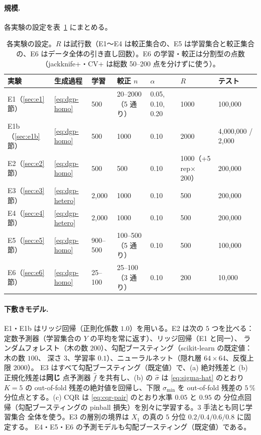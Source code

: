 \documentclass[a4paper,11pt]{jsarticle}
\theoremstyle{definition}
\theoremstyle{plain}
\theoremstyle{remark}
\newcommand{\fhat}{\hat{f}}
\begin{document}
\paragraph{規模.}
各実験の設定を表~\ref{tab:exp-setup} にまとめる。

\begin{table}[htbp]
  \centering
  \caption{各実験の設定。$R$ は試行数（E1〜E4 は較正集合の、E5 は学習集合と較正集合の、E6 はデータ全体の引き直し回数）。E6 の学習・較正は分割型の点数（jackknife+・CV+ は総数 50--200 点を分けずに使う）。}
  \label{tab:exp-setup}
  \footnotesize
  \setlength{\tabcolsep}{3pt}
  \begin{tabular}{lllllll}
    \toprule
    実験 & 生成過程 & 学習 & 較正 $n$ & $\alpha$ & $R$ & テスト \\
    \midrule
    E1（\ref{sec:e1}節） & \eqref{eq:dgp-homo} & 500 & 20--2000（5 通り） & 0.05, 0.10, 0.20 & 1000 & 100,000 \\
    E1b（\ref{sec:e1b}節） & \eqref{eq:dgp-homo} & 500 & 1000 & 0.10 & 2000 & 4,000,000 / 2,000 \\
    E2（\ref{sec:e2}節） & \eqref{eq:dgp-homo} & 500 & 500 & 0.10 & 1000（+5 rep$\times$200） & 200,000 \\
    E3（\ref{sec:e3}節） & \eqref{eq:dgp-hetero} & 2,000 & 1000 & 0.10 & 500 & 200,000 \\
    E4（\ref{sec:e4}節） & \eqref{eq:dgp-hetero} & 2,000 & 1000 & 0.10 & 500 & 200,000 \\
    E5（\ref{sec:e5}節） & \eqref{eq:dgp-homo} & 900--500 & 100--500（5 通り） & 0.10 & 500 & 100,000 \\
    E6（\ref{sec:e6}節） & \eqref{eq:dgp-homo} & 25--100 & 25--100（3 通り） & 0.10 & 200 & 10,000 \\
    \bottomrule
  \end{tabular}
\end{table}

\paragraph{下敷きモデル.}
E1・E1b はリッジ回帰（正則化係数 $1.0$）を用いる。E2 は次の $5$ つを比べる：
定数予測器（学習集合の $Y$ の平均を常に返す）、リッジ回帰（E1 と同一）、
ランダムフォレスト（木の数 $200$）、勾配ブースティング（scikit-learn の既定値：木の数 $100$、
深さ $3$、学習率 $0.1$）、ニューラルネット（隠れ層 $64\times64$、反復上限 $2000$）。
E3 はすべて勾配ブースティング（既定値）で、(a) 絶対残差と (b) 正規化残差は\textbf{同じ}
点予測器 $\fhat$ を共有し、(b) の $\hat\sigma$ は \eqref{eq:sigma-hat} のとおり
$K=5$ の out-of-fold 残差の絶対値を回帰し、下限 $\sigma_{\min}$ を out-of-fold 残差の
$5\,\%$ 分位点とする。(c) CQR は \eqref{eq:cqr-pair} のとおり水準 $0.05$ と $0.95$ の
分位点回帰（勾配ブースティングの pinball 損失）を別々に学習する。$3$ 手法とも同じ学習集合
全体を使う。E3 の層別の境界は $X_1$ の真の $5$ 分位 $0.2/0.4/0.6/0.8$ に固定する。
E4・E5・E6 の予測モデルも勾配ブースティング（既定値）である。
\end{document}

